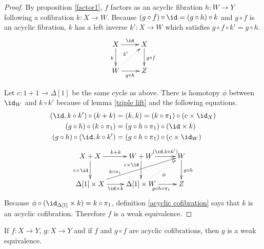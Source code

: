 \documentclass{tac}
\newcommand\of{:}
\newcommand\simplex\Delta
\begin{document}
\begin{proof} By proposition \ref{factor1}, $f$ factors as an acyclic fibration $h\of W\to Y$ following a cofibration $k\of X\to W$. Because $(g\circ f)\circ \id = (g\circ h)\circ k$ and $g\circ f$ is an acyclic fibration, $k$ has a left inverse $k'\of X\to W$ which satisfies $g\circ f\circ k' = g\circ h$. 
\[\xymatrix{
X\ar[d]_k \ar[r]^\id & X\ar[d]^{g\circ f}\\
W\ar[r]_{g\circ h} \ar@{.>}[ur]^{k'} & Z
}\]

Let $c\of 1+1\to\simplex[1]$ be the same cycle as above. There is homotopy $\phi$ between $\id_W$ and $k\circ k'$ because of lemma \ref{triple lift} and the following equations.
\begin{align*}
(\id,k\circ k')\circ(k+k) &= (k,k) = (k\circ\pi_1)\circ (c\times\id_X)\\
(g\circ h)\circ (k\circ \pi_1) &= (g\circ h\circ \pi_1)\circ(\id\times k)\\
(g\circ h)\circ (\id,k\circ k') &= (g\circ h\circ \pi_1)\circ(c\times\id_W)
\end{align*}
\[\xymatrix{
X+X \ar[d]_{c\times \id}\ar[r]^{k+k} & W+W\ar[d]_(.3){c\times\id}\ar[r]^(.6){(\id,k\circ k')} & W\ar[d]^{g\circ h}\\
\simplex[1]\times X \ar[r]_{\id\times k}\ar[urr]^(.3){k\circ\pi_1}& \simplex[1]\times W\ar[r]_{g\circ h\circ \pi_1}\ar@{.>}[ur]_\phi & Z
}\]
Because $\phi\circ (\id_{\simplex[1]}\times k)=k\circ \pi_1$, definition \ref{acyclic cofibration} says that $k$ is an acyclic cofibration. Therefore $f$ is a weak equivalence.\end{proof}

\begin{lemma} If $f\of X\to Y$, $g\of X\to Y$ and if $f$ and $g\circ f$ are acyclic cofibrations, then $g$ is a weak equivalence.\label{shared retract} \end{lemma}
\end{document}
